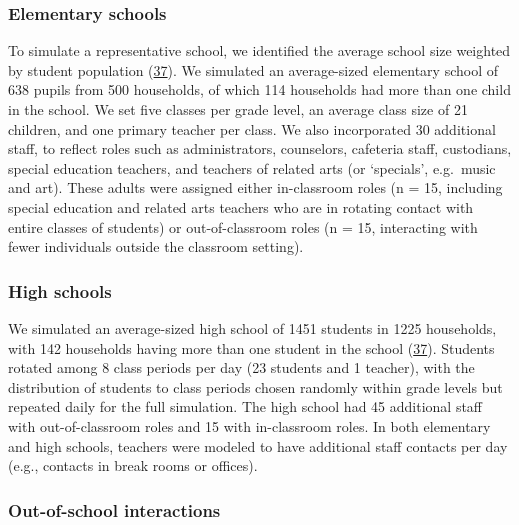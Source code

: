 \documentclass[
]{article}
\begin{document}
\medskip

\hypertarget{elementary-schools}{%
\subsubsection{Elementary schools}\label{elementary-schools}}

To simulate a representative school, we identified the average school
size weighted by student population
(\protect\hyperlink{ref-noauthor_digest_nodate}{37}). We simulated an
average-sized elementary school of 638 pupils from 500 households, of
which 114 households had more than one child in the school. We set five
classes per grade level, an average class size of 21 children, and one
primary teacher per class. We also incorporated 30 additional staff, to
reflect roles such as administrators, counselors, cafeteria staff,
custodians, special education teachers, and teachers of related arts (or
`specials', e.g.~music and art). These adults were assigned either
in-classroom roles (n = 15, including special education and related arts
teachers who are in rotating contact with entire classes of students) or
out-of-classroom roles (n = 15, interacting with fewer individuals
outside the classroom setting).

\medskip

\hypertarget{high-schools}{%
\subsubsection{High schools}\label{high-schools}}

We simulated an average-sized high school of 1451 students in 1225
households, with 142 households having more than one student in the
school (\protect\hyperlink{ref-noauthor_digest_nodate}{37}). Students
rotated among 8 class periods per day (23 students and 1 teacher), with
the distribution of students to class periods chosen randomly within
grade levels but repeated daily for the full simulation. The high school
had 45 additional staff with out-of-classroom roles and 15 with
in-classroom roles. In both elementary and high schools, teachers were
modeled to have additional staff contacts per day (e.g., contacts in
break rooms or offices).

\medskip

\hypertarget{out-of-school-interactions}{%
\subsubsection{Out-of-school
interactions}\label{out-of-school-interactions}}
\end{document}
